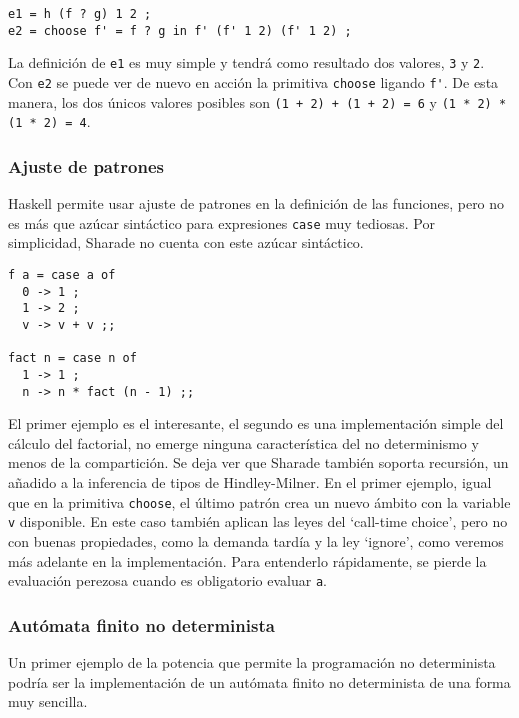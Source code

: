 \documentclass[class=article, crop=false]{standalone}
\begin{document}
\begin{verbatim}
e1 = h (f ? g) 1 2 ;
e2 = choose f' = f ? g in f' (f' 1 2) (f' 1 2) ;
\end{verbatim}

La definición de \verb`e1` es muy simple y tendrá como resultado dos valores, \verb`3` y
\verb`2`. Con \verb`e2` se puede ver de nuevo en acción la primitiva \verb`choose` ligando
\verb`f'`. De esta manera, los dos únicos valores posibles son \verb`(1 + 2) + (1 + 2) = 6` y
\verb`(1 * 2) * (1 * 2) = 4`.

\subsubsection{Ajuste de patrones}

Haskell permite usar ajuste de patrones en la definición de las funciones, pero no es más que
azúcar sintáctico para expresiones \verb`case` muy tediosas. Por simplicidad, Sharade no
cuenta con este azúcar sintáctico.

\begin{verbatim}
f a = case a of
  0 -> 1 ;
  1 -> 2 ;
  v -> v + v ;;

fact n = case n of
  1 -> 1 ;
  n -> n * fact (n - 1) ;;
\end{verbatim}

El primer ejemplo es el interesante, el segundo es una implementación simple del cálculo del
factorial, no emerge ninguna característica del no determinismo y menos de la compartición.
Se deja ver que Sharade también soporta recursión, un añadido a la inferencia de tipos de
Hindley-Milner. En el primer ejemplo, igual que en la primitiva \verb`choose`, el último
patrón crea un nuevo ámbito con la variable \verb`v` disponible. En este caso también aplican
las leyes del `call-time choice', pero no con buenas propiedades, como la demanda tardía y la
ley `ignore', como veremos más adelante en la implementación. Para entenderlo rápidamente,
se pierde la evaluación perezosa cuando es obligatorio evaluar \verb`a`.

\subsubsection{Autómata finito no determinista}

Un primer ejemplo de la potencia que permite la programación no determinista podría ser la
implementación de un autómata finito no determinista de una forma muy sencilla.
\end{document}
